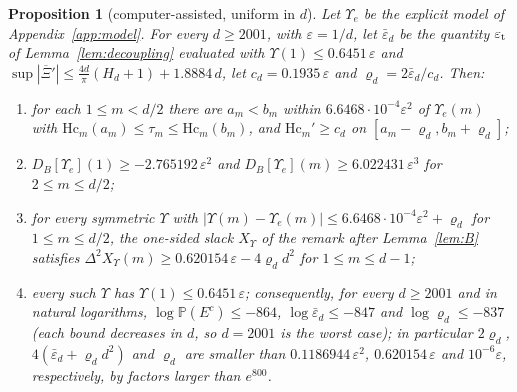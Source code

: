 \documentclass[11pt]{amsart}
\newtheorem{proposition}[theorem]{Proposition}
\theoremstyle{definition}
\theoremstyle{remark}
\numberwithin{equation}{section}
\renewcommand{\Pr}{\mathbb{P}}
\newcommand{\Xb}{\overline{\Xi}}
\begin{document}
\begin{proposition}[computer-assisted, uniform in $d$]\label{prop:regimeIII}
Let $\Upsilon_e$ be the explicit model of Appendix~\ref{app:model}. For every $d\ge2001$, with $\varepsilon=1/d$, let
$\bar\varepsilon_d$ be the quantity $\varepsilon_{\rm t}$ of Lemma~\ref{lem:decoupling} evaluated with
$\Upsilon(1)\le0.6451\,\varepsilon$ and $\sup|\Xb'|\le\frac{4d}\pi(H_d+1)+1.8884\,d$, let $c_d=0.1935\,\varepsilon$ and
$\varrho_d=2\bar\varepsilon_d/c_d$. Then:
\begin{enumerate}
\item for each $1\le m<d/2$ there are $a_m<b_m$ within $6.6468\cdot10^{-4}\varepsilon^2$ of $\Upsilon_e(m)$ with
$\mathrm{Hc}_m(a_m)\le\tau_m\le\mathrm{Hc}_m(b_m)$, and $\mathrm{Hc}_m'\ge c_d$ on $[a_m-\varrho_d,b_m+\varrho_d]$;
\item $D_B[\Upsilon_e](1)\ge-2.765192\,\varepsilon^2$ and $D_B[\Upsilon_e](m)\ge6.022431\,\varepsilon^3$ for $2\le m\le d/2$;
\item for every symmetric $\Upsilon$ with $|\Upsilon(m)-\Upsilon_e(m)|\le6.6468\cdot10^{-4}\varepsilon^2+\varrho_d$ for
$1\le m\le d/2$, the one-sided slack $X_\Upsilon$ of the remark after Lemma~\ref{lem:B} satisfies
$\Delta^2X_\Upsilon(m)\ge0.620154\,\varepsilon-4\varrho_dd^2$ for $1\le m\le d-1$;
\item every such $\Upsilon$ has $\Upsilon(1)\le0.6451\,\varepsilon$; consequently, for every $d\ge2001$ and in
natural logarithms, $\log\Pr(E^c)\le-864$, $\log\bar\varepsilon_d\le-847$ and $\log\varrho_d\le-837$ (each bound
decreases in $d$, so $d=2001$ is the worst case); in particular $2\varrho_d$, $4(\bar\varepsilon_d+\varrho_dd^2)$ and
$\varrho_d$ are smaller than $0.1186944\,\varepsilon^2$, $0.620154\,\varepsilon$ and $10^{-6}\varepsilon$, respectively,
by factors larger than $e^{800}$.
\end{enumerate}
\end{proposition}
\end{document}
